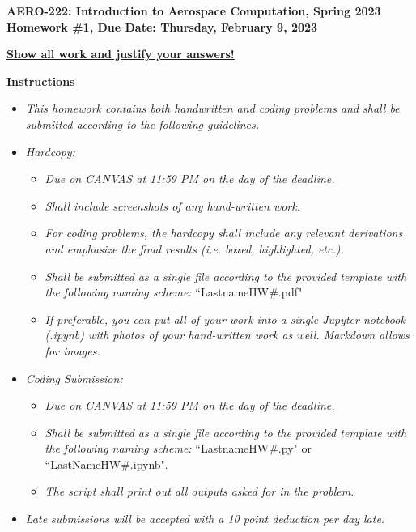 \documentclass[12pt]{article}
\begin{document}
\newif\ifsolution    %

     
\begin{center}{\bf AERO-222: Introduction to Aerospace Computation, Spring 2023\\ Homework \#1, Due Date: Thursday, February 9, 2023} \vspace{0.5cm}

\textbf{\underline{Show all work and justify your answers!}} \vspace{0.5cm}
\end{center}

{\Large \textbf{Instructions}}

\begin{itemize}
	\item \textit{This homework contains both handwritten and coding problems and shall be submitted according to the following guidelines.}
	\item \textit{Hardcopy:}
	\begin{itemize}
	    \item \textit{Due on CANVAS at 11:59 PM on the day of the deadline.}
	    \item \textit{Shall include screenshots of any hand-written work.}
	    \item \textit{For coding problems, the hardcopy shall include any relevant derivations and emphasize the final results (i.e. boxed, highlighted, etc.).}
	    \item \textit{Shall be submitted as a single file according to the provided template with the following naming scheme:} ``LastnameHW\#.pdf"
	    \item \textit{If preferable, you can put all of your work into a single Jupyter notebook (.ipynb) with photos of your hand-written work as well. Markdown allows for images. }
	\end{itemize}
	\item \textit{Coding Submission:}
	\begin{itemize}
	    \item \textit{Due on CANVAS at 11:59 PM on the day of the deadline.}
	    \item \textit{Shall be submitted as a single file according to the provided template with the following naming scheme:} ``LastnameHW\#.py" or ``LastNameHW\#.ipynb".
	    \item \textit{The script shall print out all outputs asked for in the problem}.
	\end{itemize}
    \item \textit{Late submissions will be accepted with a 10 point deduction per day late.}
\end{itemize}
\hrulefill
\end{document}
